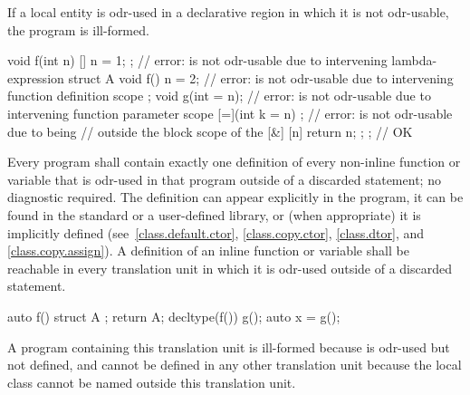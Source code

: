 If a local entity is odr-used
in a declarative region in which it is not odr-usable,
the program is ill-formed.
\begin{example}
\begin{codeblock}
void f(int n) {
  [] { n = 1; };                // error:  is not odr-usable due to intervening lambda-expression
  struct A {
    void f() { n = 2; }         // error:  is not odr-usable due to intervening function definition scope
  };
  void g(int = n);              // error:  is not odr-usable due to intervening function parameter scope
  [=](int k = n) {};            // error:  is not odr-usable due to being
                                // outside the block scope of the 
  [&] { [n]{ return n; }; };    // OK
}
\end{codeblock}
\end{example}

\pnum
Every program shall contain exactly one definition of every non-inline
function or variable that is odr-used in that program
outside of a discarded statement; no diagnostic required.
The definition can appear explicitly in the program, it can be found in
the standard or a user-defined library, or (when appropriate) it is
implicitly defined (see~\ref{class.default.ctor}, \ref{class.copy.ctor},
\ref{class.dtor}, and \ref{class.copy.assign}).
A definition of an inline function or variable shall be reachable in every
translation unit in which it is odr-used outside of a discarded statement.
\begin{example}
\begin{codeblock}
auto f() {
  struct A {};
  return A{};
}
decltype(f()) g();
auto x = g();
\end{codeblock}
A program containing this translation unit is ill-formed
because  is odr-used but not defined,
and cannot be defined in any other translation unit
because the local class  cannot be named outside this
translation unit.
\end{example}

